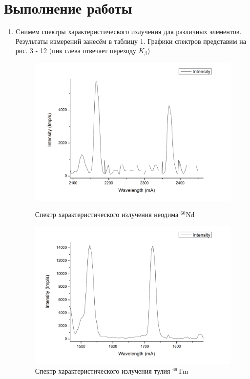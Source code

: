\documentclass[a4paper]{article}
\begin{document}
\section{Выполнение работы}
\begin{enumerate}
    \item Cнимем спектры характеристического излучения для различных элементов. Результаты измерений занесём в таблицу 1. Графики спектров представим на рис. 3 - 12 (пик слева отвечает переходу $K_{\beta}$)


    \begin{figure}[h]
\begin{center}
\begin{minipage}[h]{0.45\linewidth}
\includegraphics[width=1\linewidth]{Nd.png}
\caption{Спектр характеристического излучения неодима $^{60}$Nd} %
\end{minipage}
\hfill 
\begin{minipage}[h]{0.45\linewidth}
\includegraphics[width=1\linewidth]{Tm.png}
\caption{Спектр характеристического излучения тулия $^{69}$Tm}
\label{ris:experimcoded}
\end{minipage}
\end{center}
\end{figure}



\end{enumerate}
\end{document}
